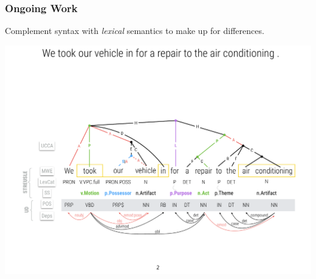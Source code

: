\documentclass[t,xcolor={svgnames,table}]{beamer}
\begin{document}
\begin{frame}
\frametitle{Ongoing Work}

Complement syntax with \textit{lexical} semantics to make up for differences.

\includegraphics[width=\textwidth]{ex-ucca-streusle.pdf}
\end{frame}
\end{document}
